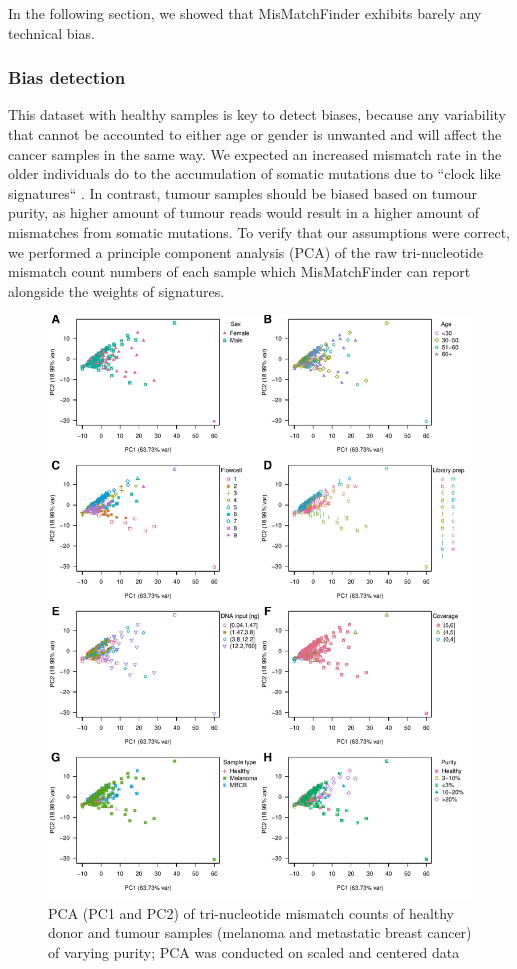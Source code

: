 In the following section, we showed that MisMatchFinder exhibits barely any technical bias.

\subsubsection{Bias detection}
\label{mmf-sec:healthyBias}
This dataset with healthy samples is key to detect biases, because any variability that cannot be accounted to either age or gender is unwanted and will affect the cancer samples in the same way. We expected an increased mismatch rate in the older individuals do to the accumulation of somatic mutations due to ``clock like signatures`` \cite{Abascal2021}. In contrast, tumour samples should be biased based on tumour purity, as higher amount of tumour reads would result in a higher amount of mismatches from somatic mutations.
To verify that our assumptions were correct, we performed a principle component analysis (PCA) of the raw tri-nucleotide mismatch count numbers of each sample which MisMatchFinder can report alongside the weights of signatures.

\begin{figure}[!ht]
\centering
\includegraphics[width=.99\linewidth]{Figures/MisMatchFinder/countPCAsPC1vsPC2.pdf}
\caption[PCA of tri-nucleotide mismatch counts of real world data (PC1 and PC2)]{PCA (PC1 and PC2) of tri-nucleotide mismatch counts of healthy donor and tumour samples (melanoma and metastatic breast cancer) of varying purity; PCA was conducted on scaled and centered data}\label{fig:mmf-pca1v2}
\end{figure}


